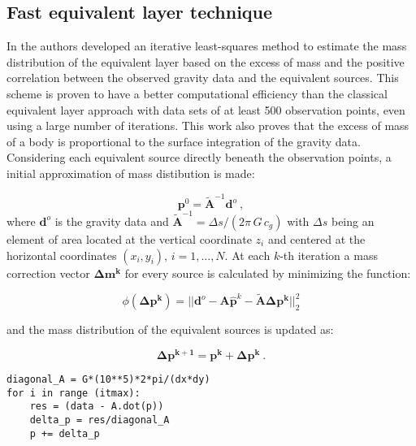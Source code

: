 \documentclass[paper]{geophysics}
\begin{document}
\subsection{Fast equivalent layer technique}
In \cite{siqueira2017fast} the authors developed an iterative least-squares method to estimate the mass distribution of the equivalent layer based on the excess of mass and the positive correlation between the observed gravity data and the equivalent sources. This scheme is proven to have a better computational efficiency than the classical equivalent layer approach with data sets of at least 500 observation points, even using a large number of iterations.
This work also proves that the excess of mass of a body is proportional to the surface integration of the gravity data. Considering each equivalent source directly beneath the observation points, a initial approximation of mass distibution is made:

\begin{equation}
\mathbf{p}^0 = \tilde{\mathbf{A}}^{-1} \mathbf{d}^{o} \: ,
\label{eq:initial_m}
\end{equation}
where $\mathbf{d}^o$ is the gravity data and $\tilde{\mathbf{A}}^{-1} = \Delta s/(2 \pi \, G \, c_g)$ with $\Delta s$ being an element of area located at the vertical coordinate $z_i$ and centered at the horizontal coordinates $(x_i,y_i), \, i = 1,..., N$. At each $k$-th iteration a mass correction vector $\mathbf{\Delta m^k}$ for every source is calculated by minimizing the function:

\begin{equation}
\phi(\mathbf{\Delta p^k}) = ||\mathbf{d}^{o} - \mathbf{A}\hat{\mathbf{p}}^k - \tilde{\mathbf{A}}\mathbf{\Delta p^k}||_2^2
\label{eq:goal-function_fast}
\end{equation}

\noindent and the mass distribution of the equivalent sources is updated as:

\begin{equation}
\mathbf{\Delta p^{k+1}} = \mathbf{p^{k}} + \mathbf{\Delta p^{k}} \: .
\label{eq:update_m}
\end{equation}

\lstset{language=Python}
\lstset{frame=lines}
\lstset{basicstyle=\footnotesize}
\begin{lstlisting}
diagonal_A = G*(10**5)*2*pi/(dx*dy)
for i in range (itmax):
	res = (data - A.dot(p))
	delta_p = res/diagonal_A
	p += delta_p
\end{lstlisting}
\end{document}
